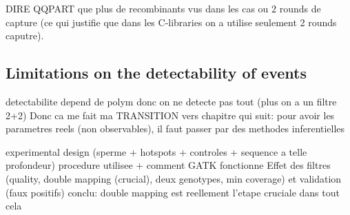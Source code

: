 DIRE QQPART que plus de recombinants vus dans les cas ou 2 rounds de capture (ce qui justifie que dans les C-libraries on a utilise seulement 2 rounds caputre).
\subsection{Limitations on the detectability of events}
detectabilite depend de polym donc on ne detecte pas tout (plus on a un filtre 2+2)
Donc ca me fait ma TRANSITION vers chapitre qui suit: pour avoir les parametres reels (non observables), il faut passer par des methodes inferentielles




experimental design (sperme + hotspots + controles + sequence a telle profondeur)
procedure utilisee + comment GATK fonctionne
Effet des filtres (quality, double mapping (crucial), deux genotypes, min coverage) et validation (faux positifs)
conclu: double mapping est reellement l'etape cruciale dans tout cela





%

















